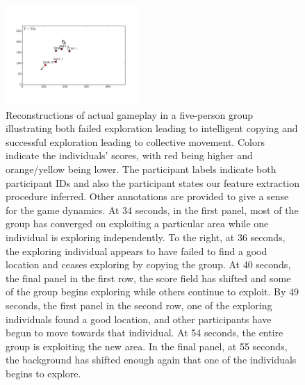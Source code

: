 \documentclass[12pt,letterpaper]{article}
\begin{document}
\begin{figure}
  \includegraphics[width=0.45\textwidth,trim=2.5cm 3cm 2cm 3cm,clip]{./figures/pos0441}
  \caption{Reconstructions of actual gameplay in a five-person group
    illustrating both failed exploration leading to intelligent
    copying and successful exploration leading to collective
    movement. Colors indicate the individuals' scores, with red being
    higher and orange/yellow being lower.  The participant labels indicate
    both participant IDs and also the participant states our feature extraction
    procedure inferred.  Other annotations are provided to give a
    sense for the game dynamics.  At $34$ seconds, in the first panel,
    most of the group has converged on exploiting a particular area
    while one individual is exploring independently.  To the right, at
    36 seconds, the exploring individual appears to have failed to
    find a good location and ceases exploring by copying the group.
    At 40 seconds, the final panel in the first row, the score field
    has shifted and some of the group begins exploring while others
    continue to exploit.  By 49 seconds, the first panel in the second
    row, one of the exploring individuals found a good location, and
    other participants have begun to move towards that individual.  At 54
    seconds, the entire group is exploiting the new area.  In the
    final panel, at 55 seconds, the background has shifted enough
    again that one of the individuals begins to explore.}
  \label{fig:example}
\end{figure}
\end{document}
